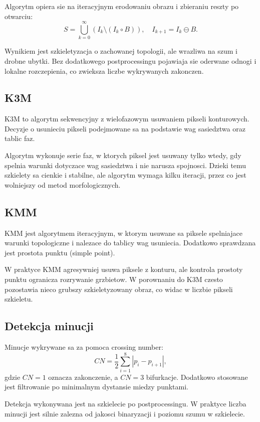 \documentclass[12pt,a4paper]{article}
\begin{document}
Algorytm opiera sie na iteracyjnym erodowaniu obrazu i zbieraniu reszty po otwarciu:
\[
S = \bigcup_{k=0}^{\infty} (I_k \setminus (I_k \circ B)), \quad I_{k+1} = I_k \ominus B.
\]

Wynikiem jest szkieletyzacja o zachowanej topologii, ale wrazliwa na szum i drobne ubytki.
Bez dodatkowego postprocessingu pojawiaja sie oderwane odnogi i lokalne rozczepienia, co
zwieksza liczbe wykrywanych zakonczen.

\subsection{K3M}

K3M to algorytm sekwencyjny z wielofazowym usuwaniem pikseli konturowych. Decyzje o usunieciu pikseli podejmowane sa na podstawie wag sasiedztwa oraz tablic faz.

Algorytm wykonuje serie faz, w ktorych piksel jest usuwany tylko wtedy, gdy spelnia warunki
dotyczace wag sasiedztwa i nie narusza spojnosci. Dzieki temu szkielety sa cienkie i stabilne,
ale algorytm wymaga kilku iteracji, przez co jest wolniejszy od metod morfologicznych.

\subsection{KMM}

KMM jest algorytmem iteracyjnym, w ktorym usuwane sa piksele spelniajace warunki topologiczne i nalezace do tablicy wag usuniecia. Dodatkowo sprawdzana jest prostota punktu (simple point).

W praktyce KMM agresywniej usuwa piksele z konturu, ale kontrola prostoty punktu ogranicza
rozrywanie grzbietow. W porownaniu do K3M czesto pozostawia nieco grubszy szkieletyzowany obraz,
co widac w liczbie pikseli szkieletu.

\subsection{Detekcja minucji}

Minucje wykrywane sa za pomoca crossing number:
\[
CN = \frac{1}{2}\sum_{i=1}^{8} |p_i - p_{i+1}|,
\]
gdzie \(CN=1\) oznacza zakonczenie, a \(CN=3\) bifurkacje. Dodatkowo stosowane jest filtrowanie po minimalnym dystansie miedzy punktami.

Detekcja wykonywana jest na szkielecie po postprocessingu. W praktyce liczba minucji jest
silnie zalezna od jakosci binaryzacji i poziomu szumu w szkielecie.
\end{document}
